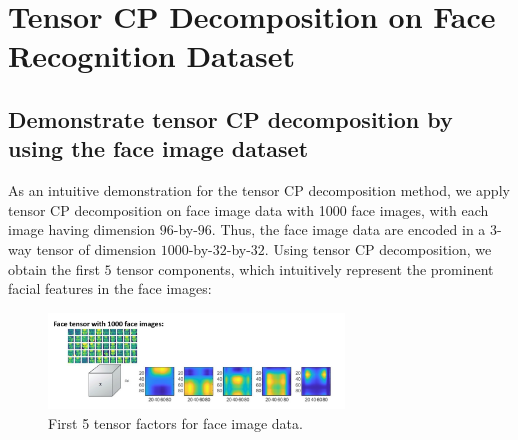 \chapter{Tensor CP Decomposition on Face Recognition Dataset}
\label{appendix-face-results}
\section{Demonstrate tensor CP decomposition by using the face image dataset}
As an intuitive demonstration for the tensor CP decomposition method, we apply tensor CP decomposition on face image data with 1000 face images, with each image having dimension $96$-by-$96$. Thus, the face image data are encoded in a $3$-way tensor of dimension $1000$-by-$32$-by-$32$. Using tensor CP decomposition, we obtain the first $5$ tensor components, which intuitively represent the prominent facial features in the face images: 
\begin{figure}[H]
    \centering
        \includegraphics[width=0.7\textwidth]{presentation/Slide2.jpg}
        \caption{First 5 tensor factors for face image data.}
    \end{figure}


